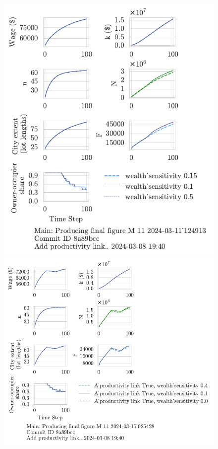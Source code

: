 \begin{figure}[h!tb] 
    \centering
    \includegraphics[scale=.75, trim={0 1.4cm 1.0cm 0},clip]{fig/wealth_sensitivity-124913.pdf} 
    \includegraphics[scale=.75, trim={0 1.4cm 4.75cm 0},clip]{fig/With-productivity_link-wealth_sensitivity-025428.pdf} 

\end{figure}

